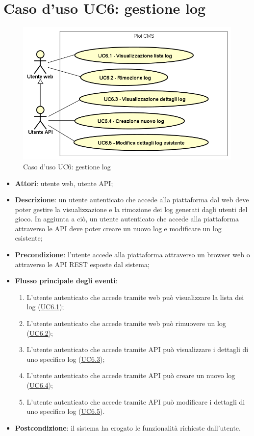 \section{Caso d'uso UC6: gestione log}

        \begin{figure}[H]
            \centering
            \includegraphics[scale=0.95, width=\textwidth]{immagini/usecase/UC6.png}
            \caption{Caso d'uso UC6: gestione log}\label{fig:UC6} 
        \end{figure}
\begin{itemize}
\item \textbf{Attori}: utente web, utente API;
\item \textbf{Descrizione}: un utente autenticato che accede alla piattaforma dal web deve poter gestire la visualizzazione e la rimozione dei log generati dagli utenti del gioco.
In aggiunta a ciò, un utente autenticato che accede alla piattaforma attraverso le API deve poter creare un nuovo log e modificare un log esistente; 
      \item \textbf{Precondizione}: l'utente accede alla piattaforma attraverso un browser web o attraverso le API REST esposte dal sistema;

        \item \textbf{Flusso principale degli eventi}:
          \begin{enumerate}
          \item L'utente autenticato che accede tramite web può visualizzare la lista dei log (\hyperlink{UC6.1}{UC6.1});
          \item L'utente autenticato che accede tramite web può rimuovere un log (\hyperlink{UC6.2}{UC6.2});
          \item L'utente autenticato che accede tramite API può visualizzare i dettagli di uno specifico log (\hyperlink{UC6.3}{UC6.3});
          \item L'utente autenticato che accede tramite API può creare un nuovo log (\hyperlink{UC6.4}{UC6.4});
          \item L'utente autenticato che accede tramite API può modificare i dettagli di uno specifico log (\hyperlink{UC6.5}{UC6.5}).

      \end{enumerate}
    \item \textbf{Postcondizione}: il sistema ha erogato le funzionalità richieste dall'utente.
  \end{itemize}
\hypertarget{UC6.1}{}
